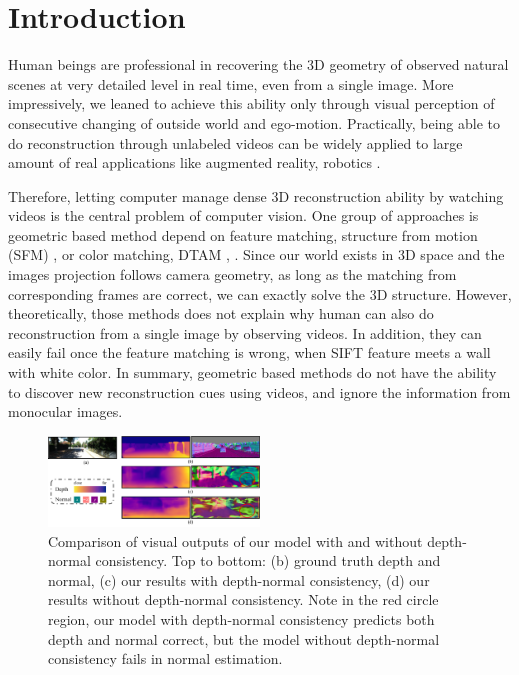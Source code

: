\section{Introduction}
\label{sec:intro}
Human beings are professional in recovering the 3D geometry of observed natural scenes at very detailed level in real time, even from a single image. 
More impressively, we leaned to achieve this ability only through visual perception of consecutive changing of outside world and ego-motion. 
Practically, being able to do reconstruction through unlabeled videos can be widely applied to large amount of real applications like augmented reality, robotics \etc.

Therefore, letting computer manage dense 3D reconstruction ability by watching videos is the central problem of computer vision. 
One group of approaches is geometric based method depend on feature matching, \eg structure from motion (SFM) \cite{wu2011visualsfm} \etc, or color matching, \eg DTAM \cite{NewcombeLD11}, \etc.  Since our world exists in 3D space and the images projection follows camera geometry, as long as the matching from corresponding frames are correct, we can exactly solve the 3D structure. 
However, theoretically, those methods does not explain why human can also do reconstruction from a single image by observing videos. In addition, they can easily fail once the feature matching is wrong, \eg when SIFT \cite{lowe2004distinctive}  feature meets a wall with white color. 
In summary, geometric based methods do not have the ability to discover new reconstruction cues using videos, and ignore the information from monocular images.

\begin{figure}
\centering
\includegraphics[width=0.5\textwidth]{figures/visual_comparison.pdf}
\caption{Comparison of visual outputs of our model with and without depth-normal consistency. Top to bottom: (b) ground truth depth and normal, (c) our results with depth-normal consistency, (d) our results without depth-normal consistency. Note in the red circle region, our model with depth-normal consistency predicts both depth and normal correct, but the model without depth-normal consistency fails in normal estimation.}
\label{fig:visual_comparison}
\end{figure}

